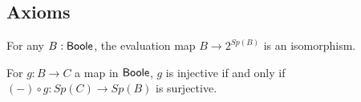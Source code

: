 \subsection{Axioms}\label{Axioms}
\begin{axiomNum}\label{AxStoneDuality}
  For any $B:\mathsf{Boole}$, 
  the evaluation map $B\rightarrow  2^{Sp(B)}$ is an isomorphism.
\end{axiomNum} 


\begin{axiomNum}\label{SurjectionsAreFormalSurjections}
  For $g:B\to C$ a map in $\mathsf{Boole}$, $g$ is injective if and only if
  $(-)\circ g: Sp(C) \to Sp(B)$ is surjective. 
\end{axiomNum} 
%

